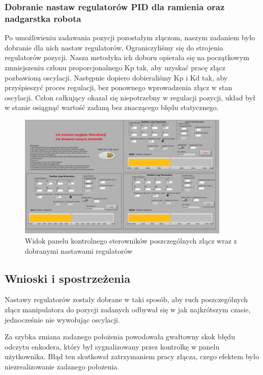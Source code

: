 \documentclass[margin = 2cm]{article}
\begin{document}
		\subsubsection{Dobranie nastaw regulatorów PID dla ramienia oraz nadgarstka robota}

		Po umożliwieniu zadawania pozycji pozostałym złączom, naszym zadaniem było dobranie dla nich nastaw regulatorów. Ograniczyliśmy się do strojenia 				regulatorów pozycji. Nasza metodyka ich doboru opierała się na początkowym zmniejszeniu członu proporcjonalnego Kp tak, aby uzyskać pracę złącz 				pozbawioną oscylacji. Następnie dopiero dobieraliśmy Kp i Kd tak, aby przyśpieszyć proces regulacji, bez ponownego wprowadzenia złącz w stan oscylacji.
		Człon całkujący okazał się niepotrzebny w regulacji pozycji, układ był w stanie osiągnąć wartość zadaną bez znaczącego błędu statycznego.

	\begin{figure}[H]
		\centering
		\includegraphics[width=0.9\textwidth]{3_panel}
		\caption{Widok panelu kontrolnego sterowników poszczególnych złącz wraz z dobranymi nastawami regulatorów}
	\end{figure}

	\subsection{Wnioski i spostrzeżenia}
Nastawy regulatorów zostały dobrane w taki sposób, aby ruch poszczególnych złącz manipulatora do pozycji zadanych odbywał się w jak najkrótszym czasie, jednocześnie nie wywołując oscylacji. 

Za szybka zmiana zadanego położenia powodowała gwałtowny skok błędu odczytu enkodera, który był sygnalizowany przez kontrolkę w panelu użytkownika. Błąd ten skutkował zatrzymaniem pracy złącza, czego efektem było niezrealizowanie zadanego położenia.
\end{document}
